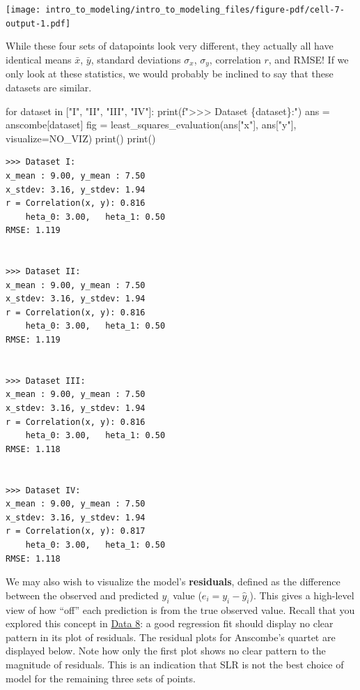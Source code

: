 \documentclass[
  letterpaper,
  DIV=11,
  numbers=noendperiod]{scrreprt}
\newenvironment{Shaded}{\begin{snugshade}}{\end{snugshade}}
\newcommand{\BuiltInTok}[1]{\textcolor[rgb]{0.00,0.23,0.31}{#1}}
\newcommand{\ControlFlowTok}[1]{\textcolor[rgb]{0.00,0.23,0.31}{#1}}
\newcommand{\KeywordTok}[1]{\textcolor[rgb]{0.00,0.23,0.31}{#1}}
\newcommand{\NormalTok}[1]{\textcolor[rgb]{0.00,0.23,0.31}{#1}}
\newcommand{\OperatorTok}[1]{\textcolor[rgb]{0.37,0.37,0.37}{#1}}
\newcommand{\SpecialCharTok}[1]{\textcolor[rgb]{0.37,0.37,0.37}{#1}}
\newcommand{\SpecialStringTok}[1]{\textcolor[rgb]{0.13,0.47,0.30}{#1}}
\newcommand{\StringTok}[1]{\textcolor[rgb]{0.13,0.47,0.30}{#1}}
\begin{document}
\texttt{[image: intro\_to\_modeling/intro\_to\_modeling\_files/figure-pdf/cell-7-output-1.pdf]}

While these four sets of datapoints look very different, they actually
all have identical means \(\bar x\), \(\bar y\), standard deviations
\(\sigma_x\), \(\sigma_y\), correlation \(r\), and RMSE! If we only look
at these statistics, we would probably be inclined to say that these
datasets are similar.

\begin{Shaded}
\begin{Highlighting}[]
\ControlFlowTok{for}\NormalTok{ dataset }\KeywordTok{in}\NormalTok{ [}\StringTok{"I"}\NormalTok{, }\StringTok{"II"}\NormalTok{, }\StringTok{"III"}\NormalTok{, }\StringTok{"IV"}\NormalTok{]:}
    \BuiltInTok{print}\NormalTok{(}\SpecialStringTok{f"\textgreater{}\textgreater{}\textgreater{} Dataset }\SpecialCharTok{\{}\NormalTok{dataset}\SpecialCharTok{\}}\SpecialStringTok{:"}\NormalTok{)}
\NormalTok{    ans }\OperatorTok{=}\NormalTok{ anscombe[dataset]}
\NormalTok{    fig }\OperatorTok{=}\NormalTok{ least\_squares\_evaluation(ans[}\StringTok{"x"}\NormalTok{], ans[}\StringTok{"y"}\NormalTok{], visualize}\OperatorTok{=}\NormalTok{NO\_VIZ)}
    \BuiltInTok{print}\NormalTok{()}
    \BuiltInTok{print}\NormalTok{()}
\end{Highlighting}
\end{Shaded}

\begin{verbatim}
>>> Dataset I:
x_mean : 9.00, y_mean : 7.50
x_stdev: 3.16, y_stdev: 1.94
r = Correlation(x, y): 0.816
    heta_0: 3.00,   heta_1: 0.50
RMSE: 1.119


>>> Dataset II:
x_mean : 9.00, y_mean : 7.50
x_stdev: 3.16, y_stdev: 1.94
r = Correlation(x, y): 0.816
    heta_0: 3.00,   heta_1: 0.50
RMSE: 1.119


>>> Dataset III:
x_mean : 9.00, y_mean : 7.50
x_stdev: 3.16, y_stdev: 1.94
r = Correlation(x, y): 0.816
    heta_0: 3.00,   heta_1: 0.50
RMSE: 1.118


>>> Dataset IV:
x_mean : 9.00, y_mean : 7.50
x_stdev: 3.16, y_stdev: 1.94
r = Correlation(x, y): 0.817
    heta_0: 3.00,   heta_1: 0.50
RMSE: 1.118

\end{verbatim}

We may also wish to visualize the model's \textbf{residuals}, defined as
the difference between the observed and predicted \(y_i\) value
(\(e_i = y_i - \hat{y}_i\)). This gives a high-level view of how ``off''
each prediction is from the true observed value. Recall that you
explored this concept in
\href{https://inferentialthinking.com/chapters/15/5/Visual_Diagnostics.html?highlight=heteroscedasticity\#detecting-heteroscedasticity}{Data
8}: a good regression fit should display no clear pattern in its plot of
residuals. The residual plots for Anscombe's quartet are displayed
below. Note how only the first plot shows no clear pattern to the
magnitude of residuals. This is an indication that SLR is not the best
choice of model for the remaining three sets of points.
\end{document}
